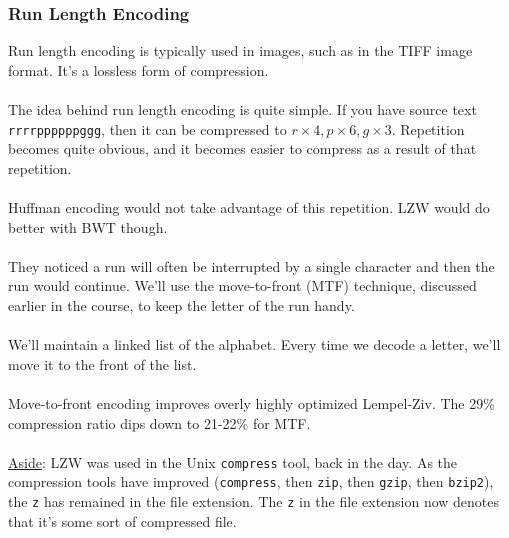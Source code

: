 \documentclass[]{article}
\theoremstyle{definition}
\begin{document}
			\subsubsection{Run Length Encoding}
				Run length encoding is typically used in images, such as in the TIFF image format. It's a lossless form of compression.
				\\ \\
				The idea behind run length encoding is quite simple. If you have source text \verb+rrrrppppppggg+, then it can be compressed to $r \times 4, p \times 6, g \times 3$. Repetition becomes quite obvious, and it becomes easier to compress as a result of that repetition.
				\\ \\
				Huffman encoding would not take advantage of this repetition. LZW would do better with BWT though.
				\\ \\
				They noticed a run will often be interrupted by a single character and then the run would continue. We'll use the move-to-front (MTF) technique, discussed earlier in the course, to keep the letter of the run handy.
				\\ \\
				We'll maintain a linked list of the alphabet. Every time we decode a letter, we'll move it to the front of the list.
				\\ \\
				Move-to-front encoding improves overly highly optimized Lempel-Ziv. The 29\% compression ratio dips down to 21-22\% for MTF.
				\\ \\
				\underline{Aside}: LZW was used in the Unix \verb+compress+ tool, back in the day. As the compression tools have improved (\verb+compress+, then \verb+zip+, then \verb+gzip+, then \verb+bzip2+), the \verb+z+ has remained in the file extension. The \verb+z+ in the file extension now denotes that it's some sort of compressed file.
			
\end{document}
